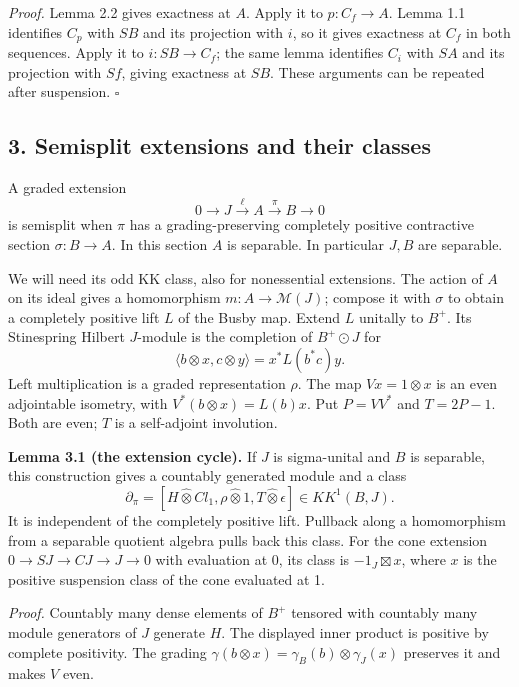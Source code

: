 \documentclass[
  11pt,
]{article}
\begin{document}
\emph{Proof.} Lemma 2.2 gives exactness at \(A\). Apply it to
\(p:C_f\to A\). Lemma 1.1 identifies \(C_p\) with \(SB\) and its
projection with \(i\), so it gives exactness at \(C_f\) in both
sequences. Apply it to \(i:SB\to C_f\); the same lemma identifies
\(C_i\) with \(SA\) and its projection with \(Sf\), giving exactness at
\(SB\). These arguments can be repeated after suspension. \(\square\)

\subsection{3. Semisplit extensions and their
classes}\label{semisplit-extensions-and-their-classes}

A graded extension \[
0\longrightarrow J\xrightarrow{\ell}A
\xrightarrow{\pi}B\longrightarrow0
\tag{3.1}
\] is semisplit when \(\pi\) has a grading-preserving completely
positive contractive section \(\sigma:B\to A\). In this section \(A\) is
separable. In particular \(J,B\) are separable.

We will need its odd KK class, also for nonessential extensions. The
action of \(A\) on its ideal gives a homomorphism
\(m:A\to\mathcal M(J)\); compose it with \(\sigma\) to obtain a
completely positive lift \(L\) of the Busby map. Extend \(L\) unitally
to \(B^+\). Its Stinespring Hilbert \(J\)-module is the completion of
\(B^+\odot J\) for \[
\langle b\otimes x,c\otimes y\rangle
=x^*L(b^*c)y.
\tag{3.2}
\] Left multiplication is a graded representation \(\rho\). The map
\(Vx=1\otimes x\) is an even adjointable isometry, with
\(V^*(b\otimes x)=L(b)x\). Put \(P=VV^*\) and \(T=2P-1\). Both are even;
\(T\) is a self-adjoint involution.

\textbf{Lemma 3.1 (the extension cycle).} If \(J\) is sigma-unital and
\(B\) is separable, this construction gives a countably generated module
and a class \[
\partial_\pi=[H\widehat\otimes Cl_1,\rho\widehat\otimes1,
T\widehat\otimes\epsilon]\in KK^1(B,J).
\tag{3.3}
\] It is independent of the completely positive lift. Pullback along a
homomorphism from a separable quotient algebra pulls back this class.
For the cone extension \(0\to SJ\to CJ\to J\to0\) with evaluation at 0,
its class is \(-1_J\boxtimes x\), where \(x\) is the positive suspension
class of the cone evaluated at 1.

\emph{Proof.} Countably many dense elements of \(B^+\) tensored with
countably many module generators of \(J\) generate \(H\). The displayed
inner product is positive by complete positivity. The grading
\(\gamma(b\otimes x)=\gamma_B(b)\otimes\gamma_J(x)\) preserves it and
makes \(V\) even.
\end{document}
